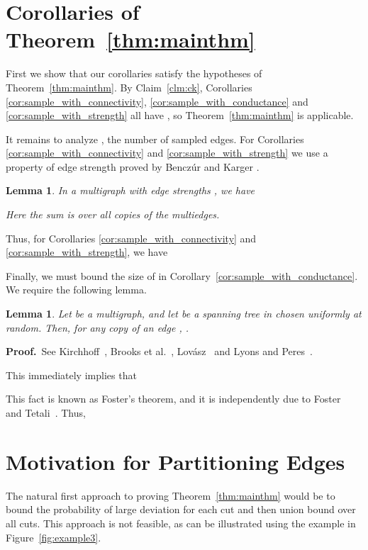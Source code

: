 \documentclass[11pt]{article}
\newcommand{\proofbelow}{8pt}
\numberwithin{equation}{section}
\newtheorem{lemma}[theorem]{Lemma}
\renewenvironment{proof}{\noindent\textbf{Proof.}\,}{\afterproof}
\newcommand{\afterproof}{\hfill  \par \vspace{\proofbelow}}
\newcommand{\AppendixName}[1]{\label{app:#1}}
\newcommand{\Claim}[1]{Claim~\ref{clm:#1}}
\newcommand{\Corollary}[1]{Corollary~\ref{cor:#1}}
\newcommand{\Figure}[1]{Figure~\ref{fig:#1}}
\newcommand{\LemmaName}[1]{\label{lem:#1}}
\newcommand{\Theorem}[1]{Theorem~\ref{thm:#1}}
\begin{document}
\section{Corollaries of \Theorem{mainthm}}
\AppendixName{corollaries}

First we show that our corollaries satisfy the hypotheses of \Theorem{mainthm}.
By \Claim{ck}, Corollaries \ref{cor:sample_with_connectivity}, \ref{cor:sample_with_conductance}
and \ref{cor:sample_with_strength} all have ,
so \Theorem{mainthm} is applicable.

It remains to analyze , the number of sampled edges.
For Corollaries \ref{cor:sample_with_connectivity} and \ref{cor:sample_with_strength}
we use a property of edge strength proved by Bencz\'ur and Karger \cite[Lemma 2.7]{BK}. 

\begin{lemma}
\LemmaName{sample_size}
In a multigraph with edge strengths , we have

Here the sum is over all copies of the multiedges.
\end{lemma}

Thus, for Corollaries \ref{cor:sample_with_connectivity} and \ref{cor:sample_with_strength}, we have


Finally, we must bound the size of  in \Corollary{sample_with_conductance}.
We require the following lemma.

\begin{lemma}
\LemmaName{kirchoff}
Let  be a multigraph, and let  be a spanning tree in 
chosen uniformly at random.
Then, for any copy of an edge , .
\end{lemma}
\begin{proof}
See Kirchhoff~\cite{Kirchhoff},
Brooks et al.~\cite[pp.~318]{BSST},
Lov\'asz~\cite[Theorem 4.1(i) and Corollary 4.2]{LovaszSurvey} and
Lyons and Peres~\cite[Corollary 4.4]{LyonsPeres}.
\end{proof}

This immediately implies that

This fact is known as Foster's theorem,
and it is independently due to Foster~\cite{Foster} and Tetali~\cite{Tetali}.
Thus,




\section{Motivation for Partitioning Edges}
\AppendixName{partitioning}

The natural first approach to proving \Theorem{mainthm}
would be to bound the probability of large deviation for each cut
and then union bound over all cuts.
This approach is not feasible, as can be illustrated using the example in \Figure{example3}.
\end{document}
